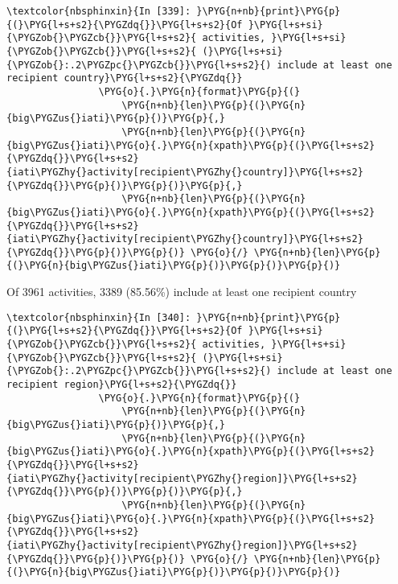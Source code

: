 \documentclass[letterpaper,10pt,english]{sphinxmanual}
\begin{document}
\begin{Verbatim}[commandchars=\\\{\}]
\textcolor{nbsphinxin}{In [339]: }\PYG{n+nb}{print}\PYG{p}{(}\PYG{l+s+s2}{\PYGZdq{}}\PYG{l+s+s2}{Of }\PYG{l+s+si}{\PYGZob{}\PYGZcb{}}\PYG{l+s+s2}{ activities, }\PYG{l+s+si}{\PYGZob{}\PYGZcb{}}\PYG{l+s+s2}{ (}\PYG{l+s+si}{\PYGZob{}:.2\PYGZpc{}\PYGZcb{}}\PYG{l+s+s2}{) include at least one recipient country}\PYG{l+s+s2}{\PYGZdq{}}
                \PYG{o}{.}\PYG{n}{format}\PYG{p}{(}
                    \PYG{n+nb}{len}\PYG{p}{(}\PYG{n}{big\PYGZus{}iati}\PYG{p}{)}\PYG{p}{,}
                    \PYG{n+nb}{len}\PYG{p}{(}\PYG{n}{big\PYGZus{}iati}\PYG{o}{.}\PYG{n}{xpath}\PYG{p}{(}\PYG{l+s+s2}{\PYGZdq{}}\PYG{l+s+s2}{iati\PYGZhy{}activity[recipient\PYGZhy{}country]}\PYG{l+s+s2}{\PYGZdq{}}\PYG{p}{)}\PYG{p}{)}\PYG{p}{,}
                    \PYG{n+nb}{len}\PYG{p}{(}\PYG{n}{big\PYGZus{}iati}\PYG{o}{.}\PYG{n}{xpath}\PYG{p}{(}\PYG{l+s+s2}{\PYGZdq{}}\PYG{l+s+s2}{iati\PYGZhy{}activity[recipient\PYGZhy{}country]}\PYG{l+s+s2}{\PYGZdq{}}\PYG{p}{)}\PYG{p}{)} \PYG{o}{/} \PYG{n+nb}{len}\PYG{p}{(}\PYG{n}{big\PYGZus{}iati}\PYG{p}{)}\PYG{p}{)}\PYG{p}{)}
\end{Verbatim}
%
\begin{OriginalVerbatim}[commandchars=\\\{\}]
Of 3961 activities, 3389 (85.56\%) include at least one recipient country
\end{OriginalVerbatim}
\relax
\begin{Verbatim}[commandchars=\\\{\}]
\textcolor{nbsphinxin}{In [340]: }\PYG{n+nb}{print}\PYG{p}{(}\PYG{l+s+s2}{\PYGZdq{}}\PYG{l+s+s2}{Of }\PYG{l+s+si}{\PYGZob{}\PYGZcb{}}\PYG{l+s+s2}{ activities, }\PYG{l+s+si}{\PYGZob{}\PYGZcb{}}\PYG{l+s+s2}{ (}\PYG{l+s+si}{\PYGZob{}:.2\PYGZpc{}\PYGZcb{}}\PYG{l+s+s2}{) include at least one recipient region}\PYG{l+s+s2}{\PYGZdq{}}
                \PYG{o}{.}\PYG{n}{format}\PYG{p}{(}
                    \PYG{n+nb}{len}\PYG{p}{(}\PYG{n}{big\PYGZus{}iati}\PYG{p}{)}\PYG{p}{,}
                    \PYG{n+nb}{len}\PYG{p}{(}\PYG{n}{big\PYGZus{}iati}\PYG{o}{.}\PYG{n}{xpath}\PYG{p}{(}\PYG{l+s+s2}{\PYGZdq{}}\PYG{l+s+s2}{iati\PYGZhy{}activity[recipient\PYGZhy{}region]}\PYG{l+s+s2}{\PYGZdq{}}\PYG{p}{)}\PYG{p}{)}\PYG{p}{,}
                    \PYG{n+nb}{len}\PYG{p}{(}\PYG{n}{big\PYGZus{}iati}\PYG{o}{.}\PYG{n}{xpath}\PYG{p}{(}\PYG{l+s+s2}{\PYGZdq{}}\PYG{l+s+s2}{iati\PYGZhy{}activity[recipient\PYGZhy{}region]}\PYG{l+s+s2}{\PYGZdq{}}\PYG{p}{)}\PYG{p}{)} \PYG{o}{/} \PYG{n+nb}{len}\PYG{p}{(}\PYG{n}{big\PYGZus{}iati}\PYG{p}{)}\PYG{p}{)}\PYG{p}{)}
\end{Verbatim}
\end{document}
